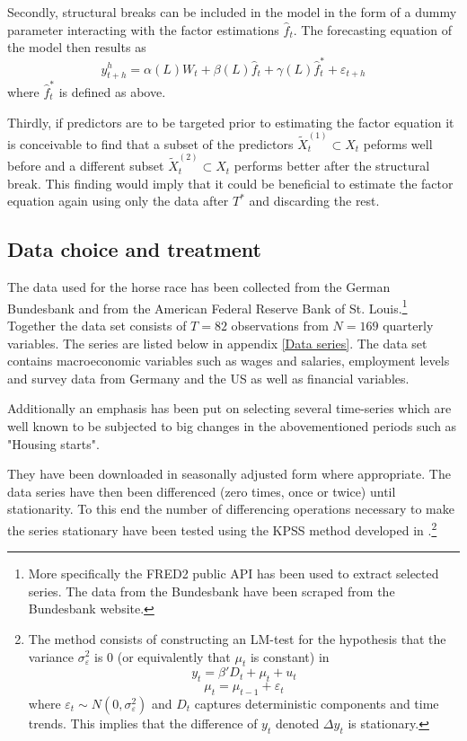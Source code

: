 \documentclass[12pt]{article}
\begin{document}
Secondly, structural breaks can be included in the model in the form of a dummy parameter interacting with the factor estimations $\hat f_t$. The forecasting equation of the model then results as
\begin{equation}
	\label{forecasting, structural breaks}
	y^h_{t+h} = \alpha(L) W_t + \beta(L) \hat f_t + \gamma(L) \hat f_t^* + \varepsilon_{t+h}
\end{equation}
where $\hat f_t^*$ is defined as above.

Thirdly, if predictors are to be targeted prior to estimating the factor equation it is conceivable to find that a subset of the predictors $\tilde X_t^{(1)} \subset X_t$ peforms well before and a different subset $\tilde X_t^{(2)} \subset X_t$ performs better after the structural break. This finding would imply that it could be beneficial to estimate the factor equation again using only the data after $T^*$ and discarding the rest.


\subsection{Data choice and treatment}
The data used for the horse race has been collected from the German Bundesbank and from the American Federal Reserve Bank of St. Louis.\footnote{More specifically the FRED2 public API has been used to extract selected series. The data from the Bundesbank have been scraped from the Bundesbank website.}  Together the data set consists of $T=82$ observations from $N=169$ quarterly variables. The series are listed below in appendix \ref{Data series}. The data set contains macroeconomic variables such as wages and salaries, employment levels and survey data from Germany and the US as well as financial variables.

Additionally an emphasis has been put on selecting several time-series which are well known to be subjected to big changes in the abovementioned periods such as "Housing starts".


They have been downloaded in seasonally adjusted form where appropriate. The data series have then been differenced (zero times, once or twice) until stationarity. To this end the number of differencing operations necessary to make the series stationary have been tested using the KPSS method developed in \citet{kwiatkowski1992testing}.\footnote{The method consists of constructing an LM-test for the hypothesis that the variance $\sigma^2_\varepsilon$ is 0 (or equivalently that $\mu_t$ is constant) in $$y_t = \beta'D_t + \mu_t + u_t$$ $$\mu_t = \mu_{t-1} + \varepsilon_t$$ where $\varepsilon_t \sim N(0, \sigma^2_\varepsilon)$ and $D_t$ captures deterministic components and time trends. This implies that the difference of $y_t$ denoted $\Delta y_t$ is stationary.}
\end{document}
